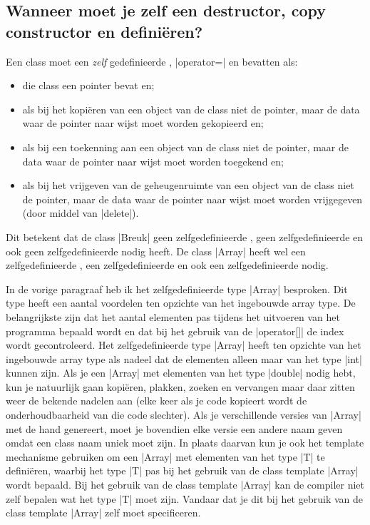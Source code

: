 \begin{cpplstShortInline}
\section[Wanneer moet je zelf een destructor, enz definiëren?]{Wanneer moet je zelf een destructor, copy constructor en \texorpdfstring{}{operator=} definiëren?}
\label{sec:ruleofthree}
Een class moet een \emph{zelf} gedefinieerde , |operator=| en  bevatten als:
\begin{itemize}
    \item die class een pointer bevat en;
    \item als bij het kopiëren van een object van de class niet de pointer, maar de data waar de pointer naar wijst moet worden gekopieerd en;
    \item als bij een toekenning aan een object van de class niet de pointer, maar de data waar de pointer naar wijst moet worden toegekend en;
    \item als bij het vrijgeven van de geheugenruimte van een object van de class niet de pointer, maar de data waar de pointer naar wijst moet worden vrijgegeven (door middel van |delete|).
\end{itemize}

Dit betekent dat de class |Breuk| geen zelfgedefinieerde , geen zelfgedefinieerde  en ook geen zelfgedefinieerde  nodig heeft.
De class |Array| heeft wel een zelfgedefinieerde , een zelfgedefinieerde  en ook een zelfgedefinieerde  nodig.

In de vorige paragraaf heb ik het zelfgedefinieerde type |Array| besproken.
Dit type heeft een aantal voordelen ten opzichte van het ingebouwde array type.
De belangrijkste zijn dat het aantal elementen pas tijdens het uitvoeren van het programma bepaald wordt en dat bij het gebruik van de |operator[]| de index wordt gecontroleerd.
Het zelfgedefinieerde type |Array| heeft ten opzichte van het ingebouwde array type als nadeel dat de elementen alleen maar van het type |int| kunnen zijn.
Als je een |Array| met elementen van het type |double| nodig hebt, kun je natuurlijk gaan kopiëren, plakken, zoeken en vervangen maar daar zitten weer de bekende nadelen aan (elke keer als je code kopieert wordt de onderhoudbaarheid van die code slechter).
Als je verschillende versies van |Array| met de hand genereert, moet je bovendien elke versie een andere naam geven omdat een class naam uniek moet zijn.
In plaats daarvan kun je ook het template mechanisme gebruiken om een |Array| met elementen van het type |T| te definiëren, waarbij het type |T| pas bij het gebruik van de class template |Array| wordt bepaald.
Bij het gebruik van de class template |Array| kan de compiler niet zelf bepalen wat het type |T| moet zijn.
Vandaar dat je dit bij het gebruik van de class template |Array| zelf moet specificeren. 


\end{cpplstShortInline}
